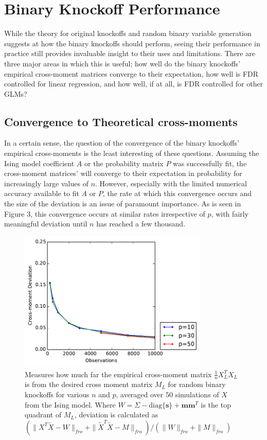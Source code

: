 \documentclass[11pt]{article}
\newcommand{\diag}[1]{\mathrm{diag}\{#1\}}
\theoremstyle{definition}
\begin{document}
\section{Binary Knockoff Performance}
    While the theory for original knockoffs and random binary variable generation suggests at how the binary knockoffs should perform, seeing their performance in practice still provides invaluable insight to their uses and limitations. There are three major areas in which this is useful; how well do the binary knockoffs' empirical cross-moment matrices converge to their expectation, how well is FDR controlled for linear regression, and how well, if at all, is FDR controlled for other GLMs?

\subsection{Convergence to Theoretical cross-moments} 
    \FloatBarrier
        In a certain sense, the question of the convergence of the binary knockoffs' empirical cross-moments is the least interesting of these questions. Assuming the Ising model coefficient $A$ or the probability matrix $P$ was successfully fit, the cross-moment matrices' will converge to their expectation in probability for increasingly large values of $n$. However, especially with the limited numerical accuracy available to fit $A$ or $P$, the rate at which this convergence occurs and the size of the deviation is an issue of paramount importance. As is seen in Figure 3, this convergence occurs at similar rates irrespective of $p$, with fairly meaningful deviation until $n$ has reached a few thousand.
    \begin{figure}[h]
        \begin{center}
        \includegraphics[width=9cm]{images/sigma_fit}
    \end{center}
    \caption{Measures how much far the empirical cross-moment matrix $\frac{1}{n}X_L^TX_L$ is from the desired cross moment matrix $M_L$ for random binary knockoffs for various $n$ and $p$, averaged over $50$ simulations of $X$ from the Ising model. Where $W = \Sigma - \diag{\mathbf s} + \mathbf m \mathbf m^T$ is the top quadrant of $M_L$, deviation is calculated as \\ $(\|X^T\tilde X - W\|_{fro} + \|\tilde X^T \tilde X - M\|_{fro})/(\|W\|_{fro}+\|M\|_{fro})$}  
    \end{figure}
\end{document}
